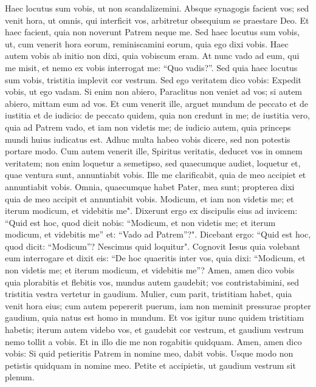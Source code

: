 \begin{biblechapter} 
\verse Haec locutus sum vobis, ut non scandalizemini. 
\verse Absque synagogis facient vos; sed venit hora, ut omnis, qui interficit vos, arbitretur obsequium se praestare Deo. 
\verse Et haec facient, quia non noverunt Patrem neque me. 
\verse Sed haec locutus sum vobis, ut, cum venerit hora eorum, reminiscamini eorum, quia ego dixi vobis. Haec autem vobis ab initio non dixi, quia vobiscum eram. 
\verse At nunc vado ad eum, qui me misit, et nemo ex vobis interrogat me: “Quo vadis?”. 
\verse Sed quia haec locutus sum vobis, tristitia implevit cor vestrum.  
\verse Sed ego veritatem dico vobis: Expedit vobis, ut ego vadam. Si enim non abiero, Paraclitus non veniet ad vos; si autem abiero, mittam eum ad vos. 
\verse Et cum venerit ille, arguet mundum de peccato et de iustitia et de iudicio: 
\verse de peccato quidem, quia non credunt in me; 
\verse de iustitia vero, quia ad Patrem vado, et iam non videtis me; 
\verse de iudicio autem, quia princeps mundi huius iudicatus est. 
\verse Adhuc multa habeo vobis dicere, sed non potestis portare modo. 
\verse Cum autem venerit ille, Spiritus veritatis, deducet vos in omnem veritatem; non enim loquetur a semetipso, sed quaecumque audiet, loquetur et, quae ventura sunt, annuntiabit vobis. 
\verse Ille me clarificabit, quia de meo accipiet et annuntiabit vobis. 
\verse Omnia, quaecumque habet Pater, mea sunt; propterea dixi quia de meo accipit et annuntiabit vobis. 
\verse Modicum, et iam non videtis me; et iterum modicum, et videbitis me". 
\verse Dixerunt ergo ex discipulis eius ad invicem: “Quid est hoc, quod dicit nobis: “Modicum, et non videtis me; et iterum modicum, et videbitis me” et: “Vado ad Patrem”?". 
\verse Dicebant ergo: “Quid est hoc, quod dicit: “Modicum”? Nescimus quid loquitur". 
\verse Cognovit Iesus quia volebant eum interrogare et dixit eis: “De hoc quaeritis inter vos, quia dixi: “Modicum, et non videtis me; et iterum modicum, et videbitis me”? 
\verse Amen, amen dico vobis quia plorabitis et flebitis vos, mundus autem gaudebit; vos contristabimini, sed tristitia vestra vertetur in gaudium. 
\verse Mulier, cum parit, tristitiam habet, quia venit hora eius; cum autem pepererit puerum, iam non meminit pressurae propter gaudium, quia natus est homo in mundum. 
\verse Et vos igitur nunc quidem tristitiam habetis; iterum autem videbo vos, et gaudebit cor vestrum, et gaudium vestrum nemo tollit a vobis. 
\verse Et in illo die me non rogabitis quidquam. Amen, amen dico vobis: Si quid petieritis Patrem in nomine meo, dabit vobis.  
\verse Usque modo non petistis quidquam in nomine meo. Petite et accipietis, ut gaudium vestrum sit plenum. 

\end{biblechapter}
